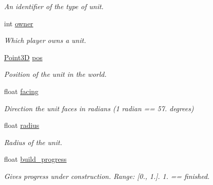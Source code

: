 \begin{DoxyCompactItemize}
\begin{DoxyCompactList}\small\item\em An identifier of the type of unit. \end{DoxyCompactList}\item 
\mbox{\label{classsc2_1_1_unit_a29fec2e9dff50d8504e8a2b32f7a1af0}} 
int \hyperlink{classsc2_1_1_unit_a29fec2e9dff50d8504e8a2b32f7a1af0}{owner}
\begin{DoxyCompactList}\small\item\em Which player owns a unit. \end{DoxyCompactList}\item 
\mbox{\label{classsc2_1_1_unit_adbe75d15c90712cb1e55e8b8bcbc1319}} 
\hyperlink{structsc2_1_1_point3_d}{Point3D} \hyperlink{classsc2_1_1_unit_adbe75d15c90712cb1e55e8b8bcbc1319}{pos}
\begin{DoxyCompactList}\small\item\em Position of the unit in the world. \end{DoxyCompactList}\item 
\mbox{\label{classsc2_1_1_unit_a9f947f6dffd571c2ab89ddd53609a7f4}} 
float \hyperlink{classsc2_1_1_unit_a9f947f6dffd571c2ab89ddd53609a7f4}{facing}
\begin{DoxyCompactList}\small\item\em Direction the unit faces in radians (1 radian == 57. degrees) \end{DoxyCompactList}\item 
\mbox{\label{classsc2_1_1_unit_a0c2d1fb9e6f150333d96cc8ce8f9e9bf}} 
float \hyperlink{classsc2_1_1_unit_a0c2d1fb9e6f150333d96cc8ce8f9e9bf}{radius}
\begin{DoxyCompactList}\small\item\em Radius of the unit. \end{DoxyCompactList}\item 
\mbox{\label{classsc2_1_1_unit_abb3c46774c4d5dab4d641a4abcf68aba}} 
float \hyperlink{classsc2_1_1_unit_abb3c46774c4d5dab4d641a4abcf68aba}{build\+\_\+progress}
\begin{DoxyCompactList}\small\item\em Gives progress under construction. Range\+: \mbox{[}0., 1.\mbox{]}. 1. == finished. \end{DoxyCompactList}\item 

\end{DoxyCompactItemize}
